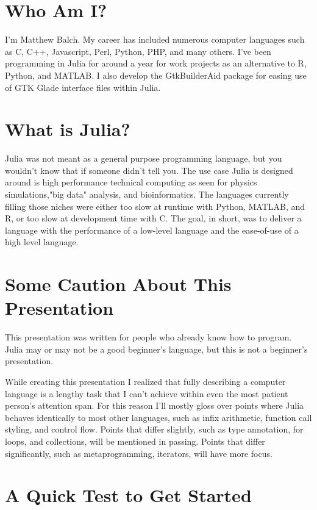 \documentclass{article}
\begin{document}
\section{Who Am I?}

I'm Matthew Balch. My career has included numerous computer languages such as
C, C++, Javascript, Perl, Python, PHP, and many others. I've been programming 
in Julia for around a year for work projects as an alternative to R, Python,
and MATLAB. I also develop the GtkBuilderAid package for easing use of GTK
Glade interface files within Julia.

\section{What is Julia?}

Julia was not meant as a general purpose programming language, but you wouldn't
know that if someone didn't tell you. The use case Julia is designed around is 
high performance technical computing as seen for physics simulations,"big data"
analysis, and bioinformatics. The languages currently filling those niches were
either too slow at runtime with Python, MATLAB, and R, or too slow at 
development time with C. The goal, in short, was to deliver a language with the
performance of a low-level language and the ease-of-use of a high level
language.

\section{Some Caution About This Presentation}

This presentation was written for people who already know how to program. Julia
may or may not be a good beginner's language, but this is not a beginner's
presentation.

While creating this presentation I realized that fully describing a computer
language is a lengthy task that I can't achieve within even the most patient
person's attention span. For this reason I'll mostly gloss over points where
Julia behaves identically to most other languages, such as infix arithmetic,
function call styling, and control flow. Points that differ slightly, such
as type annotation, for loops, and collections, will be mentioned in passing.
Points that differ significantly, such as metaprogramming, iterators, will 
have more focus.

\section{A Quick Test to Get Started}
\end{document}

